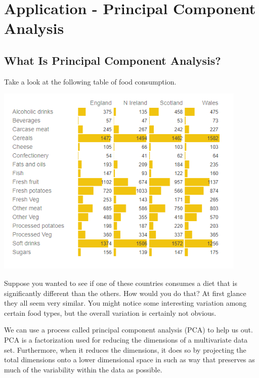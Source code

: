\documentclass{article}
\begin{document}
\newpage
\section{Application - Principal Component Analysis}
\subsection{What Is Principal Component Analysis?}
Take a look at the following table of food consumption.

\begin{center}
\includegraphics[width=12cm]{(17)}
\end{center}


Suppose you wanted to see if one of these countries consumes a diet that is significantly different than the others. How would you do that? At first glance they all seem very similar. You might notice some interesting variation among certain food types, but the overall variation is certainly not obvious.
\bigskip

We can use a process called principal component analysis (PCA) to help us out. PCA is a factorization used for reducing the dimensions of a multivariate data set. Furthermore, when it reduces the dimensions, it does so by projecting the total dimensions onto a lower dimensional space in such as way that preserves as much of the variability within the data as possible.
\end{document}
